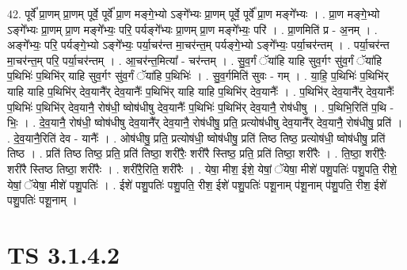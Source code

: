 \documentclass[17pt]{extarticle}
\begin{document}
42. पूर्वे᳚ प्रा॒णम् प्रा॒णम् पूर्वे॒ पूर्वे᳚ प्रा॒ण मङ्गे॒भ्यो ऽङ्गे᳚भ्यः प्रा॒णम् पूर्वे॒ पूर्वे᳚ प्रा॒ण मङ्गे᳚भ्यः । . प्रा॒ण मङ्गे॒भ्यो ऽङ्गे᳚भ्यः प्रा॒णम् प्रा॒ण मङ्गे᳚भ्यः॒ परि॒ पर्यङ्गे᳚भ्यः प्रा॒णम् प्रा॒ण मङ्गे᳚भ्यः॒ परि॑ । . प्रा॒णमिति॑ प्र - अ॒नम् । . अङ्गे᳚भ्यः॒ परि॒ पर्यङ्गे॒भ्यो ऽङ्गे᳚भ्यः॒ पर्या॒चर॑न्त मा॒चर॑न्त॒म् पर्यङ्गे॒भ्यो ऽङ्गे᳚भ्यः॒ पर्या॒चर॑न्तम् । . पर्या॒चर॑न्त मा॒चर॑न्त॒म् परि॒ पर्या॒चर॑न्तम् । . आ॒चर॑न्त॒मित्या᳚ - चर॑न्तम् । . सु॒व॒र्गं ॅया॑हि याहि सुव॒र्गꣳ सु॑व॒र्गं ॅया॑हि प॒थिभिः॑ प॒थिभि॑र् याहि सुव॒र्गꣳ सु॑व॒र्गं ॅया॑हि प॒थिभिः॑ । . सु॒व॒र्गमिति॑ सुवः - गम् । . या॒हि॒ प॒थिभिः॑ प॒थिभि॑र् याहि याहि प॒थिभि॑र् देव॒यानै᳚र् देव॒यानैः᳚ प॒थिभि॑र् याहि याहि प॒थिभि॑र् देव॒यानैः᳚ । . प॒थिभि॑र् देव॒यानै᳚र् देव॒यानैः᳚ प॒थिभिः॑ प॒थिभि॑र् देव॒यानै॒ रोष॑धी॒ ष्वोष॑धीषु देव॒यानैः᳚ प॒थिभिः॑ प॒थिभि॑र् देव॒यानै॒ रोष॑धीषु । . प॒थिभि॒रिति॑ प॒थि - भिः॒ । . दे॒व॒यानै॒ रोष॑धी॒ ष्वोष॑धीषु देव॒यानै᳚र् देव॒यानै॒ रोष॑धीषु॒ प्रति॒ प्रत्योष॑धीषु देव॒यानै᳚र् देव॒यानै॒ रोष॑धीषु॒ प्रति॑ । . दे॒व॒यानै॒रिति॑ देव - यानैः᳚ । . ओष॑धीषु॒ प्रति॒ प्रत्योष॑धी॒ ष्वोष॑धीषु॒ प्रति॑ तिष्ठ तिष्ठ॒ प्रत्योष॑धी॒ ष्वोष॑धीषु॒ प्रति॑ तिष्ठ । . प्रति॑ तिष्ठ तिष्ठ॒ प्रति॒ प्रति॑ तिष्ठा॒ शरी॑रैः॒ शरी॑रै स्तिष्ठ॒ प्रति॒ प्रति॑ तिष्ठा॒ शरी॑रैः । . ति॒ष्ठा॒ शरी॑रैः॒ शरी॑रै स्तिष्ठ तिष्ठा॒ शरी॑रैः । . शरी॑रै॒रिति॒ शरी॑रैः । . येषा॒ मीश॒ ईशे॒ येषां॒ ॅयेषा॒ मीशे॑ पशु॒पतिः॑ पशु॒पति॒ रीशे॒ येषां॒ ॅयेषा॒ मीशे॑ पशु॒पतिः॑ । . ईशे॑ पशु॒पतिः॑ पशु॒पति॒ रीश॒ ईशे॑ पशु॒पतिः॑ पशू॒नाम् प॑शू॒नाम् प॑शु॒पति॒ रीश॒ ईशे॑ पशु॒पतिः॑ पशू॒नाम् । \newline
\pagebreak
{}

\section{ TS 3.1.4.2 }
\end{document}
